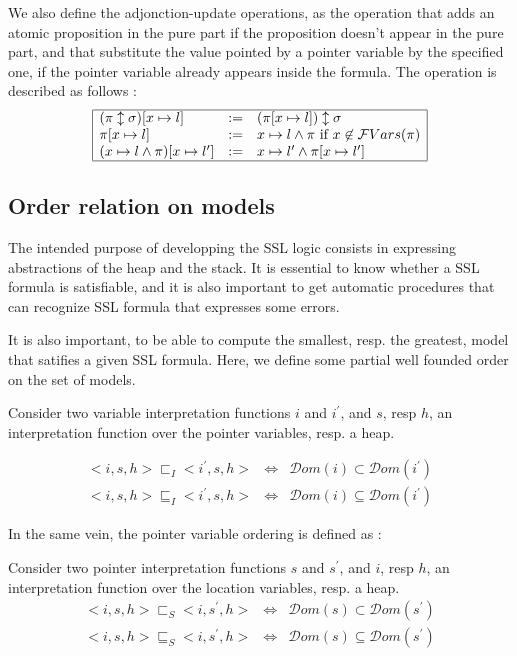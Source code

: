 \documentclass[a4paper,twoside,12pt]{report}
\newcommand{\Dom}[1]{\mathcal{D}om(#1)}
\newcommand{\Pointsto}[2]{ #1 \mapsto #2}
\newcommand{\Formula}[2]{ #1  \updownarrow #2}
\newcommand{\FVars}[1]{\mathcal{F}Vars(#1)}
\newcommand{\Addrep}[2]{#1 \lbrack #2 \rbrack}
\newcommand{\LocOrderIneq}[0]{\sqsubset_{I}}
\newcommand{\LocOrderIeq}[0]{\sqsubseteq_{I}}
\newcommand{\PtrOrderIneq}[0]{\sqsubset_{S}}
\newcommand{\PtrOrderIeq}[0]{\sqsubseteq_{S}}
\begin{document}
We also define the adjonction-update operations, as the operation
that adds an atomic proposition in the pure part if the proposition doesn't appear in the pure part, and that substitute the value pointed by a pointer variable
by the specified one, if the pointer variable already appears inside the
formula.
The operation is described as follows :
$$
\begin{array}{|lll|}
\hline
\Addrep{(\Formula{\pi}{\sigma})}{\Pointsto{x}{l}}&:=& \Formula{(\Addrep{\pi}{\Pointsto{x}{l}})}{\sigma} \\
\Addrep{\pi}{\Pointsto{x}{l}} &:=& \Pointsto{x}{l}\wedge \pi \mbox{ if } x\not\in \FVars{\pi} \\
\Addrep{(\Pointsto{x}{l}\wedge \pi)}{\Pointsto{x}{l^{\prime}}} &:=& \Pointsto{x}{l^{\prime}}\wedge \Addrep{\pi}{\Pointsto{x}{l^{\prime}}} \\
\hline
\end{array}
$$   
\subsection{Order relation on models}

The intended purpose of developping the SSL logic consists in expressing
abstractions of the heap and the stack. It is essential to know whether
a SSL formula is satisfiable, and it is also important to get automatic
procedures that can recognize SSL formula that expresses some errors.
  
It is also important, to be able to compute the smallest, resp.
the greatest, model that satifies a given SSL formula. Here, we define
some partial well founded order on the set of models.

\begin{definition}
Consider two variable interpretation functions $i$ and $i^{\prime}$,
and $s$, resp $h$, an interpretation function over the pointer variables,
resp. a heap.


$$
\begin{array}{lll}
<i,s,h>\LocOrderIneq <i^{\prime},s,h> &\Leftrightarrow &\Dom{i} \subset \Dom{i^{\prime}} \\ 
<i,s,h>\LocOrderIeq <i^{\prime},s,h> &\Leftrightarrow& \Dom{i} \subseteq  \Dom{i^{\prime}} 
\end{array}
$$
\end{definition}

In the same vein, the pointer variable ordering is defined as :

\begin{definition}
Consider two pointer interpretation functions $s$ and $s^{\prime}$,
and $i$, resp $h$, an interpretation function over the location variables,
resp. a heap.
$$
\begin{array}{lll}
<i,s,h>\PtrOrderIneq <i,s^{\prime},h> &\Leftrightarrow &\Dom{s} \subset \Dom{s^{\prime}} \\ 
<i,s,h>\PtrOrderIeq <i,s^{\prime},h> &\Leftrightarrow& \Dom{s} \subseteq  \Dom{s^{\prime}} 
\end{array}
$$
\end{definition}
\end{document}

